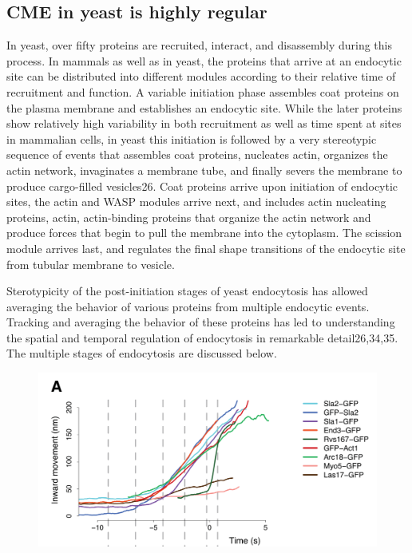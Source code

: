 		\subsection{CME in yeast is highly regular}
		In yeast, over fifty proteins are recruited, interact, and disassembly during this process. In mammals as well as in yeast, the proteins that arrive at an endocytic site can be distributed into different modules according to their relative time of recruitment and function. A variable initiation phase assembles coat proteins on the plasma membrane and establishes an endocytic site. While the later proteins show relatively high variability in both recruitment as well as time spent at sites in mammalian cells, in yeast this initiation is followed by a very stereotypic sequence of events that assembles coat proteins, nucleates actin, organizes the actin network, invaginates a membrane tube, and finally severs the membrane to produce cargo-filled vesicles26. Coat proteins arrive upon initiation of endocytic sites, the actin and WASP modules arrive next, and includes actin nucleating proteins, actin, actin-binding proteins that organize the actin network and produce forces that begin to pull the membrane into the cytoplasm. The scission module arrives last, and regulates the final shape transitions of the endocytic site from tubular membrane to vesicle. 

		\vspace{5mm}
		Sterotypicity of the post-initiation stages of yeast endocytosis has allowed averaging the behavior of various proteins from multiple endocytic events. Tracking and averaging the behavior of these proteins has led to understanding the spatial and temporal regulation of endocytosis in remarkable detail26,34,35. The multiple stages of endocytosis are discussed below. 
		
		\begin{figure}[H]
			\centering
			\includegraphics[scale=0.5]{figures/intro/fig4_screenshot}
		\end{figure}
		
